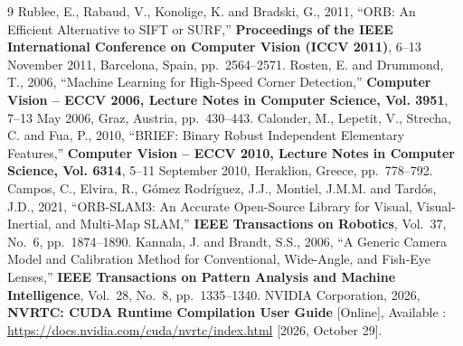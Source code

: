 \documentclass[11pt,a4paper,notitlepage]{report}
\begin{document}
\begin{thebibliography}{9}
Rublee, E., Rabaud, V., Konolige, K. and Bradski, G., 2011, ``ORB: An Efficient Alternative to SIFT or SURF,'' \textbf{Proceedings of the IEEE International Conference on Computer Vision (ICCV 2011)}, 6--13 November 2011, Barcelona, Spain, pp.~2564--2571.
Rosten, E. and Drummond, T., 2006, ``Machine Learning for High-Speed Corner Detection,'' \textbf{Computer Vision -- ECCV 2006, Lecture Notes in Computer Science, Vol. 3951}, 7--13 May 2006, Graz, Austria, pp.~430--443.
Calonder, M., Lepetit, V., Strecha, C. and Fua, P., 2010, ``BRIEF: Binary Robust Independent Elementary Features,'' \textbf{Computer Vision -- ECCV 2010, Lecture Notes in Computer Science, Vol. 6314}, 5--11 September 2010, Heraklion, Greece, pp.~778--792.
Campos, C., Elvira, R., G\'omez Rodr\'iguez, J.J., Montiel, J.M.M. and Tard\'os, J.D., 2021, ``ORB-SLAM3: An Accurate Open-Source Library for Visual, Visual-Inertial, and Multi-Map SLAM,'' \textbf{IEEE Transactions on Robotics}, Vol.~37, No.~6, pp.~1874--1890.
Kannala, J. and Brandt, S.S., 2006, ``A Generic Camera Model and Calibration Method for Conventional, Wide-Angle, and Fish-Eye Lenses,'' \textbf{IEEE Transactions on Pattern Analysis and Machine Intelligence}, Vol.~28, No.~8, pp.~1335--1340.
NVIDIA Corporation, 2026, \textbf{NVRTC: CUDA Runtime Compilation User Guide} [Online], Available : \url{https://docs.nvidia.com/cuda/nvrtc/index.html} [2026, October 29].
\end{thebibliography}
\end{document}
